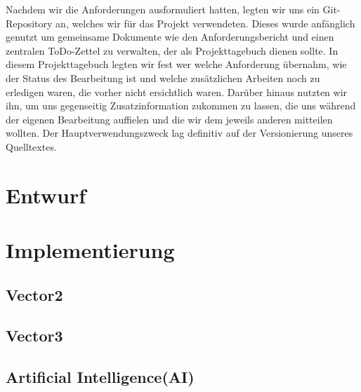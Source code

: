 \documentclass[a4paper]{scrartcl}
\begin{document}
Nachdem wir die Anforderungen ausformuliert hatten, legten wir uns ein Git-Repository an, welches wir für das Projekt verwendeten. Dieses wurde anfänglich genutzt um gemeinsame Dokumente wie den Anforderungsbericht und einen zentralen ToDo-Zettel zu verwalten, der als Projekttagebuch dienen sollte. In diesem Projekttagebuch legten wir fest wer welche Anforderung übernahm, wie der Status des Bearbeitung ist und welche zusätzlichen Arbeiten noch zu erledigen waren, die vorher nicht ersichtlich waren. Darüber hinaus nutzten wir ihn, um uns gegenseitig Zusatzinformation zukommen zu lassen, die uns während der eigenen Bearbeitung auffielen und die wir dem jeweils anderen mitteilen wollten. Der Hauptverwendungszweck lag definitiv auf der Versionierung unseres Quelltextes.

\section{Entwurf}\label{Entwurf}


\section{Implementierung}\label{Implementierung}



\subsection{Vector2}\label{Vector2}
\subsection{Vector3}\label{Vector3}
\subsection{Artificial Intelligence(AI)}\label{AI}
\end{document}

